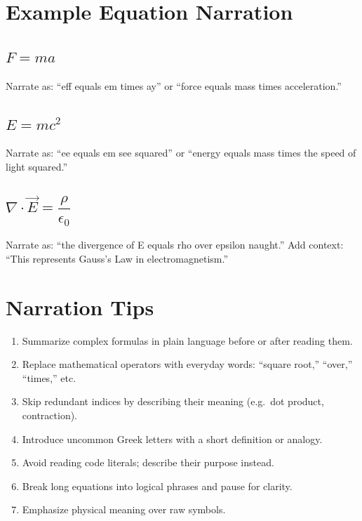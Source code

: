 \documentclass[11pt]{article}
\begin{document}
\section{Example Equation Narration}

\subsection*{$F = m a$}
Narrate as: ``eff equals em times ay'' or ``force equals mass times acceleration.''

\subsection*{$E = m c^{2}$}
Narrate as: ``ee equals em see squared'' or ``energy equals mass times the speed of light squared.''

\subsection*{$\nabla \cdot \vec{E} = \dfrac{\rho}{\epsilon_{0}}$}
Narrate as: ``the divergence of E equals rho over epsilon naught.''  
Add context: ``This represents Gauss's Law in electromagnetism.''

\section{Narration Tips}

\begin{enumerate}[label=\arabic*.]
  \item Summarize complex formulas in plain language before or after reading them.
  \item Replace mathematical operators with everyday words: ``square root,'' ``over,'' ``times,'' etc.
  \item Skip redundant indices by describing their meaning (e.g.\ dot product, contraction).
  \item Introduce uncommon Greek letters with a short definition or analogy.
  \item Avoid reading code literals; describe their purpose instead.
  \item Break long equations into logical phrases and pause for clarity.
  \item Emphasize physical meaning over raw symbols.
\end{enumerate}
\end{document}
